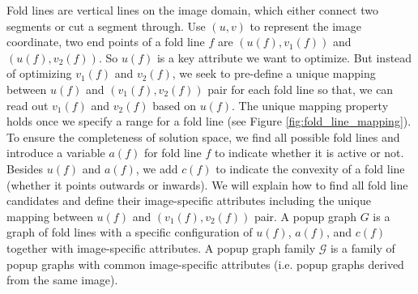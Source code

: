 Fold lines are vertical lines on the image domain, which either connect two segments or cut a segment through. Use $(u, v)$ to represent the image coordinate, two end points of a fold line $f$ are $(u(f), v_1(f))$ and $(u(f), v_2(f))$. So $u(f)$ is a key attribute we want to optimize. But instead of optimizing $v_1(f)$ and $v_2(f)$, we seek to pre-define a unique mapping between $u(f)$ and $(v_1(f), v_2(f))$ pair for each fold line so that, we can read out $v_1(f)$ and $v_2(f)$ based on $u(f)$. The unique mapping property holds once we specify a range for a fold line (see Figure \ref{fig:fold_line_mapping}). To ensure the completeness of solution space, we find all possible fold lines and introduce a variable $a(f)$ for fold line $f$ to indicate whether it is active or not. Besides $u(f)$ and $a(f)$, we add $c(f)$ to indicate the convexity of a fold line (whether it points outwards or inwards). We will explain how to find all fold line candidates and define their image-specific attributes including the unique mapping between $u(f)$ and $(v_1(f), v_2(f))$ pair. A popup graph $G$ is a graph of fold lines with a specific configuration of $u(f)$, $a(f)$, and $c(f)$ together with image-specific attributes. A popup graph family $\mathcal{G}$ is a family of popup graphs with common image-specific attributes (i.e. popup graphs derived from the same image).

